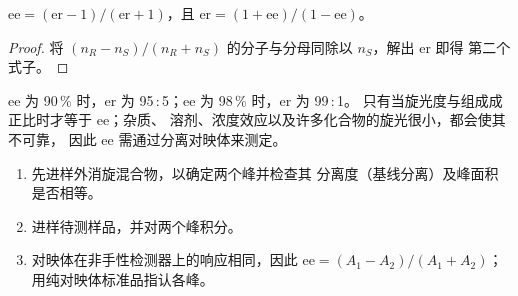 \begin{proposition}[ee 与 er]\label{prop:b3:asymmetric-synthesis:ee-er}
$\mathrm{ee} = (\mathrm{er} - 1)/(\mathrm{er} + 1)$，且 $\mathrm{er} = (1 + \mathrm{ee})/(1 - \mathrm{ee})$。
\end{proposition}

\begin{proof}
将 $(n_R - n_S)/(n_R + n_S)$ 的分子与分母同除以 $n_S$，解出 er 即得
第二个式子。
\end{proof}

ee 为 90\,\% 时，er 为 95\,:\,5；ee 为 98\,\% 时，er 为 99\,:\,1。
只有当旋光度与组成成正比时才等于 ee；杂质、
溶剂、浓度效应以及许多化合物的旋光很小，都会使其不可靠，
因此 ee 需通过分离对映体来测定。

\begin{method}[由手性色谱图求对映体过量]\label{met:b3:asymmetric-synthesis:ee-chromatogram}
\begin{enumerate}
  \item 先进样外消旋混合物，以确定两个峰并检查其
        分离度（基线分离）及峰面积是否相等。
  \item 进样待测样品，并对两个峰积分。
  \item 对映体在非手性检测器上的响应相同，因此
        $\mathrm{ee} = (A_1 - A_2)/(A_1 + A_2)$；用纯对映体标准品指认各峰。
\end{enumerate}
\end{method}

